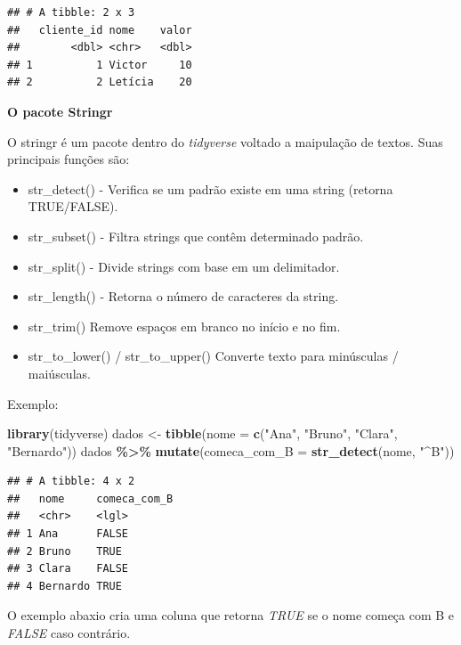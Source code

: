 \documentclass[
]{book}
\newenvironment{Shaded}{\begin{snugshade}}{\end{snugshade}}
\newcommand{\AttributeTok}[1]{\textcolor[rgb]{0.13,0.29,0.53}{#1}}
\newcommand{\FunctionTok}[1]{\textcolor[rgb]{0.13,0.29,0.53}{\textbf{#1}}}
\newcommand{\NormalTok}[1]{#1}
\newcommand{\OtherTok}[1]{\textcolor[rgb]{0.56,0.35,0.01}{#1}}
\newcommand{\SpecialCharTok}[1]{\textcolor[rgb]{0.81,0.36,0.00}{\textbf{#1}}}
\newcommand{\StringTok}[1]{\textcolor[rgb]{0.31,0.60,0.02}{#1}}
\providecommand{\tightlist}{%
  \setlength{\itemsep}{0pt}\setlength{\parskip}{0pt}}
\begin{document}
\begin{verbatim}
## # A tibble: 2 x 3
##   cliente_id nome    valor
##        <dbl> <chr>   <dbl>
## 1          1 Victor     10
## 2          2 Letícia    20
\end{verbatim}

\textbf{O pacote Stringr}

O stringr é um pacote dentro do \emph{tidyverse} voltado a maipulação de textos. Suas principais funções são:

\begin{itemize}
\tightlist
\item
  str\_detect() - Verifica se um padrão existe em uma string (retorna TRUE/FALSE).
\item
  str\_subset() - Filtra strings que contêm determinado padrão.
\item
  str\_split() - Divide strings com base em um delimitador.
\item
  str\_length() - Retorna o número de caracteres da string.
\item
  str\_trim() Remove espaços em branco no início e no fim.
\item
  str\_to\_lower() / str\_to\_upper() Converte texto para minúsculas / maiúsculas.
\end{itemize}

Exemplo:

\begin{Shaded}
\begin{Highlighting}[]
\FunctionTok{library}\NormalTok{(tidyverse)}
\NormalTok{dados }\OtherTok{\textless{}{-}} \FunctionTok{tibble}\NormalTok{(}\AttributeTok{nome =} \FunctionTok{c}\NormalTok{(}\StringTok{"Ana"}\NormalTok{, }\StringTok{"Bruno"}\NormalTok{, }\StringTok{"Clara"}\NormalTok{, }\StringTok{"Bernardo"}\NormalTok{))}
\NormalTok{dados }\SpecialCharTok{\%\textgreater{}\%}
  \FunctionTok{mutate}\NormalTok{(}\AttributeTok{comeca\_com\_B =} \FunctionTok{str\_detect}\NormalTok{(nome, }\StringTok{"\^{}B"}\NormalTok{))}
\end{Highlighting}
\end{Shaded}

\begin{verbatim}
## # A tibble: 4 x 2
##   nome     comeca_com_B
##   <chr>    <lgl>       
## 1 Ana      FALSE       
## 2 Bruno    TRUE        
## 3 Clara    FALSE       
## 4 Bernardo TRUE
\end{verbatim}

O exemplo abaxio cria uma coluna que retorna \emph{TRUE} se o nome começa com B e \emph{FALSE} caso contrário.
\end{document}

